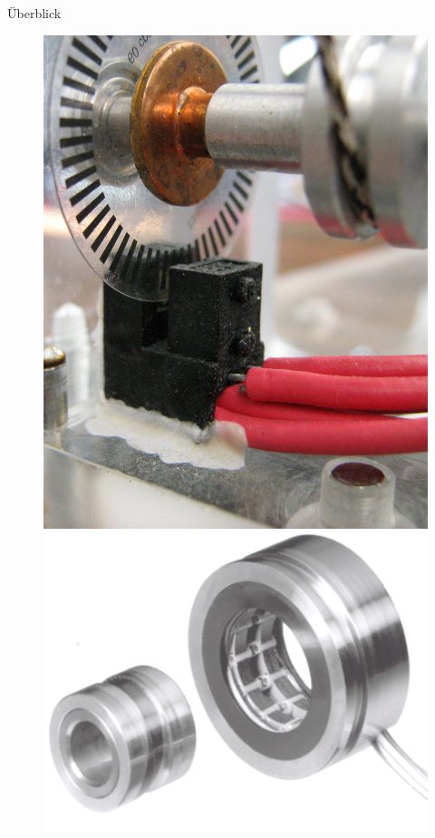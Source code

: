 \documentclass{beamer}
\begin{document}
\begin{frame}[plain]{Überblick}
	\begin{figure}
		\begin{minipage}{0.3\textwidth}
			\includegraphics[width=\linewidth]{img/inkrementalgeber}
		\end{minipage}
		\begin{minipage}{0.3\textwidth}
			\includegraphics[width=\linewidth]{img/resolver.jpg}

\end{minipage}
\end{figure}
\end{frame}
\end{document}

